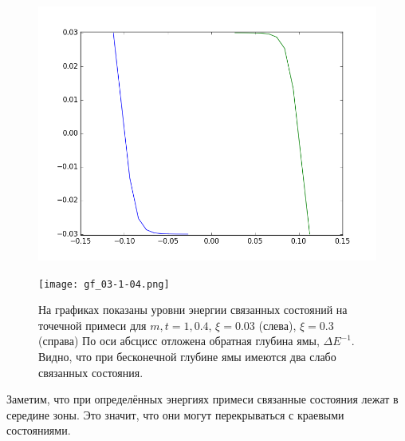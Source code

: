 \begin{figure}[h]
    \centering
    \begin{minipage}[t]{0.45\linewidth}
        \includegraphics[width=0.8\linewidth]{impurity_levels.png}
    \end{minipage}
    \hfill
    \begin{minipage}[t]{0.45\linewidth}
        \texttt{[image: gf\_03-1-04.png]}
    \end{minipage}
        \caption{
                На графиках показаны уровни энергии связанных состояний на точечной примеси
                для $m,t = 1,0.4$, $\xi = 0.03$ (слева), $\xi = 0.3$ (справа)
                По оси абсцисс отложена обратная глубина ямы, $\Delta E^{-1}$. Видно,
                что при бесконечной глубине ямы имеются два слабо связанных состояния.
                }
    \label{fig:impurity_numeric_levels}
\end{figure}

Заметим, что при определённых энергиях примеси связанные состояния лежат в середине 
зоны. Это значит, что они могут перекрываться с краевыми состояниями.
